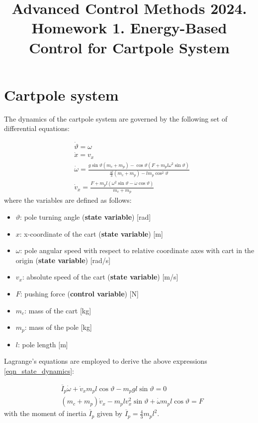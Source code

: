 \documentclass[12pt]{article}
\title{Advanced Control Methods 2024. Homework 1. Energy-Based Control for Cartpole System}
\begin{document}
\section*{Cartpole system}

The dynamics of the cartpole system are governed by the following set of differential equations:

\begin{equation}
    \label{eqn_state_dynamics}
    \begin{aligned}
        &\dot{\vartheta} =  \omega \\
        &\dot{x} = v_x \\
        &\dot{\omega} =  \frac{g \sin{\vartheta}(m_c + m_p) - \cos{\vartheta}(F + m_p l \omega^2 \sin{\vartheta})}{\frac{4l}{3}(m_c + m_p) - lm_p \cos^2{\vartheta}}\\
        &\dot{v}_x = \frac{F + m_p l (\omega ^2 \sin{\vartheta} - \dot{\omega}   \cos{\vartheta})}{m_c + m_p}
    \end{aligned}
\end{equation}
where the variables are defined as follows:
\begin{itemize}
\item $\vartheta$: pole turning angle (\textbf{state variable}) [rad]
\item $x$: x-coordinate of the cart (\textbf{state variable}) [m]
\item $\omega$: pole angular speed with respect to relative coordinate axes with cart in the origin (\textbf{state variable}) [rad/s]
\item $v_x$: absolute speed of the cart (\textbf{state variable}) [m/s]
\item $F$: pushing force (\textbf{control variable}) [N]
\item $m_c$: mass of the cart [kg]
\item $m_p$: mass of the pole [kg]
\item $l$: pole length [m]
  
\end{itemize}
Lagrange's equations are employed to derive the above expressions \eqref{eqn_state_dynamics}:

\begin{eqnarray}
\label{eqn_sum_moments}
& \overline{I}_p \dot{\omega} + \dot{v}_x m_p l\cos \vartheta  - m_p g l \sin \vartheta = 0 \\ 
\label{eqn_2nd_newton_law}
& (m_c + m_p) \dot{v}_x - m_p l v_x^2 \sin \vartheta + \dot{\omega} m_p l \cos \vartheta  = F
\end{eqnarray}
with the moment of inertia $\overline{I}_p$ given by $\overline{I}_p  = \frac{4}{3}m_p l ^ 2 $.
\end{document}
